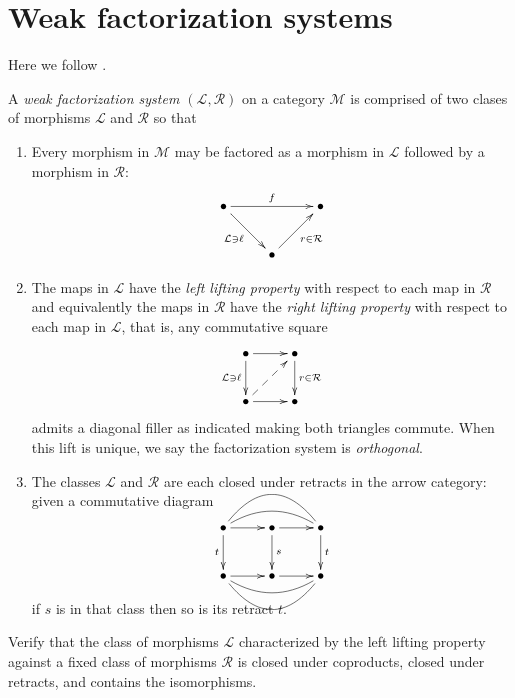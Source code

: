 \section{Weak factorization systems}
\label{section-weak-factorization-systems}

Here we follow \cite{Riehl}.

\begin{definition}
\label{definition-weak-factorization-system}
A {\it weak factorization system
$(\mathcal{L},\mathcal{R})$} on a category
$\mathcal{M}$ is comprised of two clases of
morphisms $\mathcal{L}$
and $\mathcal{R}$ so that

\begin{enumerate}
\item Every morphism in $\mathcal{M}$ may be
factored as a morphism in $\mathcal{L}$
followed by a morphism in $\mathcal{R}$:
$$
\xymatrix{
\bullet\ar[rr]^{f}\ar[rd]_{\mathcal{L}
\ni\ell}
&& \bullet\\
& \bullet\ar[ru]_{r\in\mathcal{R}}
}
$$

\item The maps in $\mathcal{L}$ have the {\it
left lifting property} with respect to each
map in $\mathcal{R}$ and equivalently the
maps in $\mathcal{R}$ have the {\it right
lifting property} with respect to each map in
$\mathcal{L}$, that is, any commutative
square
$$
\xymatrix{
\bullet\ar[d]_{\mathcal{L}\ni\ell}\ar[r]
& \bullet\ar[d]^{r\in\mathcal{R}}\\
\bullet\ar@{-->}[ur]\ar[r]
& \bullet
}
$$
admits a diagonal filler as indicated making
both triangles commute.
When this lift is unique,
we say the factorization system is {\it
orthogonal}.

\item The classes $\mathcal{L}$ and
$\mathcal{R}$ are each closed under
retracts in the arrow category:
given a commutative diagram
$$
\xymatrix{
\bullet\ar[r]\ar[d]_{t}\ar@/^1pc/@{-}[rr]
\ar@/^2pc/@{-}[rr]
& \bullet\ar[r]\ar[d]^{s}
& \bullet\ar[d]^{t}\\
\bullet\ar[r]\ar@/_1pc/@{-}[rr]\ar@/_2pc/@{-}
[rr]
& \bullet\ar[r]
& \bullet
}
$$

\noindent
if $s$ is in that class then so is its
retract $t$.
\end{enumerate}
\end{definition}

\begin{exercise}[3.1.8, Rihel]
\label{exercise-3-1-8-rihel}
Verify that the class of morphisms
$\mathcal{L}$ characterized
by the left lifting property against a fixed
class of morphisms $\mathcal{R}$ is closed
under coproducts,
closed under retracts, and contains the
isomorphisms.
\end{exercise}

